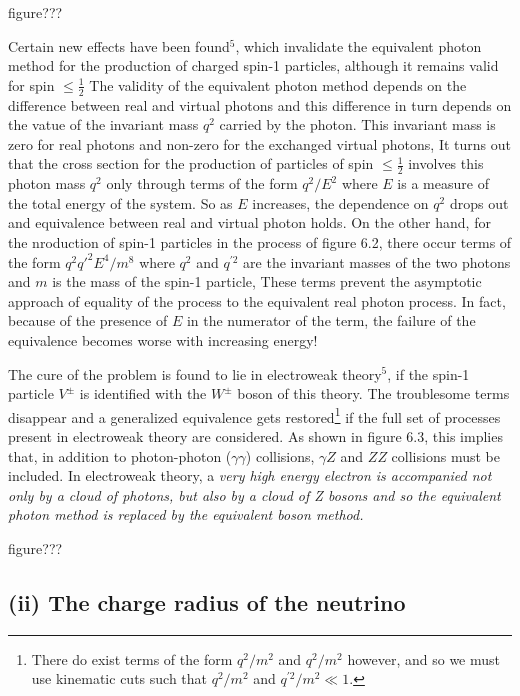 figure???

Certain new effects have been found$^{5}$, which invalidate the equivalent photon method for the
production of charged spin-1 particles, although it remains valid for spin $\leq \frac{1}{2}$ The validity of the
equivalent photon method depends on the difference between real and virtual photons and this
difference in turn depends on the vatue of the invariant mass $q^{2}$ carried by the photon. This
invariant mass is zero for real photons and non-zero for the exchanged virtual photons, It turns
out that the cross section for the production of particles of spin $\leq \frac{1}{2}$ involves this photon mass $q^{2}$
only through terms of the form $q^{2}/E^{2}$ where $E$ is a measure of the total energy of the system. So
as $E$ increases, the dependence on $q^{2}$ drops out and equivalence between real and virtual photon
holds. On the other hand, for the nroduction of spin-1 particles in the process of figure 6.2, there
occur terms of the form $q^{2}q'^{2}E^{4}/m^{8}$ where $q^{2}$ and $q^{'2}$ are the invariant masses of the two photons 
and $m$ is the mass of the spin-1 particle, These terms prevent the asymptotic approach of equality of the process to the equivalent real photon process. In fact, because of the presence of $E$ in the numerator of the term, the failure of the equivalence becomes worse with increasing energy! 

The cure of the problem is found to lie in electroweak theory$^{5}$, if the spin-1 particle $V^{\pm}$ is identified with the $W^{\pm}$ boson of this theory. The troublesome terms disappear and a generalized equivalence gets restored\footnote{ There do exist terms of the form $q^{2}/m^{2}$ and $q^{2}/m^{2}$ however, and so we must use kinematic cuts such that  $q^{2}/m^{2}$ and  $q^{'2}/m^{2} \ll 1$. } if the full set of processes present in electroweak theory are considered. As shown in figure 6.3, this implies that, in addition to photon-photon ($\gamma \gamma$) collisions, $\gamma Z$ and $ZZ$ collisions must be included. In electroweak theory, a {\it very high energy electron is accompanied not only by a cloud of photons, but also by a cloud of Z bosons and so the equivalent photon method is replaced by the equivalent boson method.} 

figure???

\subsection*{(ii) The charge radius of the neutrino}

